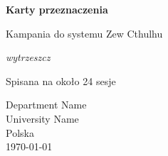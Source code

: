 \begin{titlepage}
   \begin{center}
       \vspace*{1cm}

       \textbf{Karty przeznaczenia}

       \vspace{0.5cm}
       Kampania do systemu Zew Cthulhu

       \vspace{1.5cm}

       \textit{wytrzeszcz}
       \vfill

       Spisana na około 24 sesje

       \vspace{0.8cm}


       Department Name\\
       University Name\\
       Polska\\
       \today

   \end{center}
\end{titlepage}
